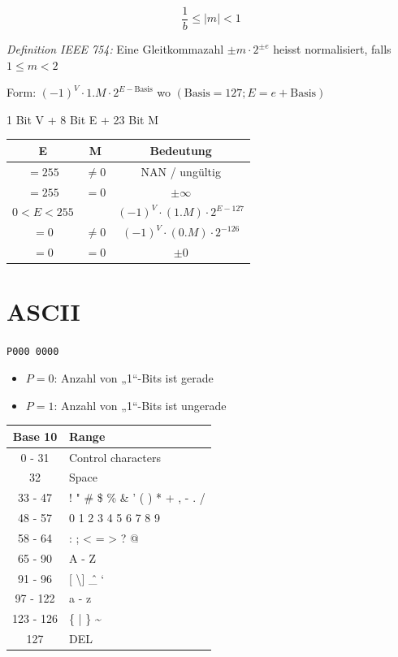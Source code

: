 \documentclass[a4paper,6pt]{article}
\begin{document}
\begin{multicols*}{3}
\begin{equation*}
    \frac{1}{b} \leq |m| < 1
\end{equation*}

\textit{Definition IEEE 754: }Eine Gleitkommazahl $\pm m \cdot 2^{\pm e}$ heisst normalisiert, falls $1 \leq m < 2$

Form: $(-1)^V \cdot 1.M \cdot 2^{E-\text{Basis}}$ wo $(\text{Basis} = 127; E = e + \text{Basis})$ 

1 Bit V + 8 Bit E + 23 Bit M
\begin{center}
    \begin{tabular}{|c|c|c|}
    \hline
    E & M & Bedeutung \\ \hline
    \(=255\) & \(\neq0\) & NAN / ungültig \\ \hline
    \(=255\) & \(=0\) & \(\pm\infty\) \\ \hline
    \(0 < E < 255\) & & \((-1)^V \cdot (1.M) \cdot 2^{E-127}\) \\ \hline
    \(=0\) & \(\neq0\) & \((-1)^V \cdot (0.M) \cdot 2^{-126}\) \\ \hline
    \(=0\) & \(=0\) & \(\pm0\) \\ \hline
    \end{tabular}
\end{center}

\section{ASCII}

\texttt{P000 0000}
\begin{itemize}
    \item $P = 0$: Anzahl von „1“-Bits ist gerade
    \item $P = 1$: Anzahl von „1“-Bits ist ungerade
\end{itemize}

\begin{center}
    \begin{tabular}{|c|l|}
    \hline
    Base 10 & Range \\ \hline
    0 - 31 & Control characters \\ \hline
    32 & Space \\ \hline
    33 - 47 & ! " \# \$ \% \& ' ( ) * + , - . / \\ \hline
    48 - 57 & 0 1 2 3 4 5 6 7 8 9 \\ \hline
    58 - 64 & : ; < = > ? @ \\ \hline
    65 - 90 & A - Z \\ \hline
    91 - 96 & [ \textbackslash ] \^ \_ ` \\ \hline
    97 - 122 & a - z \\ \hline
    123 - 126 & \{ | \} \textasciitilde \\ \hline
    127 & DEL \\ \hline
    \end{tabular}
\end{center}


\end{multicols*}
\end{document}
